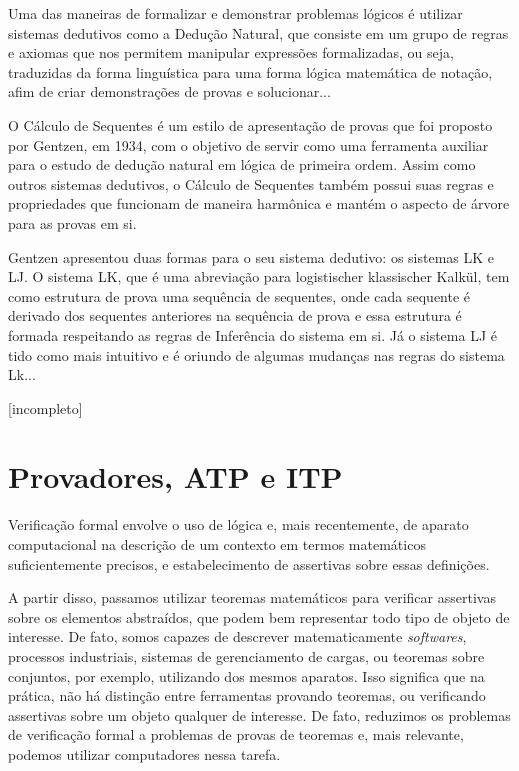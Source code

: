 
Uma das maneiras de formalizar e demonstrar problemas lógicos é utilizar sistemas dedutivos como a Dedução Natural, que consiste em um grupo de regras e axiomas que nos permitem manipular expressões formalizadas, ou seja, traduzidas da forma linguística para uma forma lógica matemática de notação, afim de criar demonstrações de provas e solucionar...


O Cálculo de Sequentes é um estilo de apresentação de provas que foi proposto por Gentzen, em 1934, com o objetivo de servir como uma ferramenta auxiliar para o estudo de dedução natural em lógica de primeira ordem. Assim como outros sistemas dedutivos, o Cálculo de Sequentes também possui suas regras e propriedades que funcionam de maneira harmônica e mantém o aspecto de árvore para as provas em si. 

Gentzen apresentou duas formas para o seu sistema dedutivo: os sistemas LK e LJ. O sistema LK, que é uma abreviação para logistischer klassischer Kalkül, tem como estrutura de prova uma sequência de sequentes, onde cada sequente é derivado dos sequentes anteriores na sequência de prova e essa estrutura é formada respeitando as regras de Inferência do sistema em si. Já o sistema LJ é tido como mais intuitivo e é oriundo de algumas mudanças nas regras do sistema Lk...



[incompleto]

\section{Provadores, ATP e ITP}

Verificação formal envolve o uso de lógica e, mais recentemente, de aparato computacional na descrição de um contexto em termos matemáticos suficientemente precisos, e estabelecimento de assertivas sobre essas definições.

A partir disso, passamos utilizar teoremas matemáticos para verificar assertivas sobre os elementos abstraídos, que podem bem representar todo tipo de objeto de interesse.
De fato, somos capazes de descrever matematicamente \textit{softwares}, processos industriais, sistemas de gerenciamento de cargas, ou teoremas sobre conjuntos, por exemplo, utilizando dos mesmos aparatos.
Isso significa que na prática, não há distinção entre ferramentas provando teoremas, ou verificando assertivas sobre um objeto qualquer de interesse.
De fato, reduzimos os problemas de verificação formal a problemas de provas de teoremas e, mais relevante, podemos utilizar computadores nessa tarefa.

